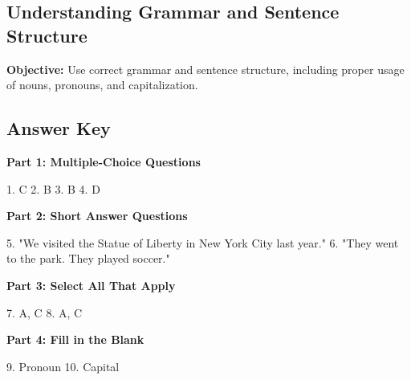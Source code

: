\documentclass[12pt]{article}
\begin{document}
\subsection*{Understanding Grammar and Sentence Structure}
\onehalfspacing

\begin{tcolorbox}[colframe=black!40, colback=gray!0, title=Learning Objective]
\textbf{Objective:} Use correct grammar and sentence structure, including proper usage of nouns, pronouns, and capitalization.
\end{tcolorbox}



\subsection*{Answer Key}

\textbf{Part 1: Multiple-Choice Questions}

1. C  
2. B  
3. B  
4. D  

\textbf{Part 2: Short Answer Questions}

5. "We visited the Statue of Liberty in New York City last year."  
6. "They went to the park. They played soccer."  

\textbf{Part 3: Select All That Apply}

7. A, C  
8. A, C  

\textbf{Part 4: Fill in the Blank}

9. Pronoun  
10. Capital  
\end{document}
